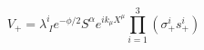 \begin{equation}
V_+ = \lambda^i_{\ I}
e^{-\phi/2} S^{\alpha} e^{ik_\mu X^\mu}
\prod_{i=1}^3 (\sigma_+^i s_+^i)
\end{equation}

